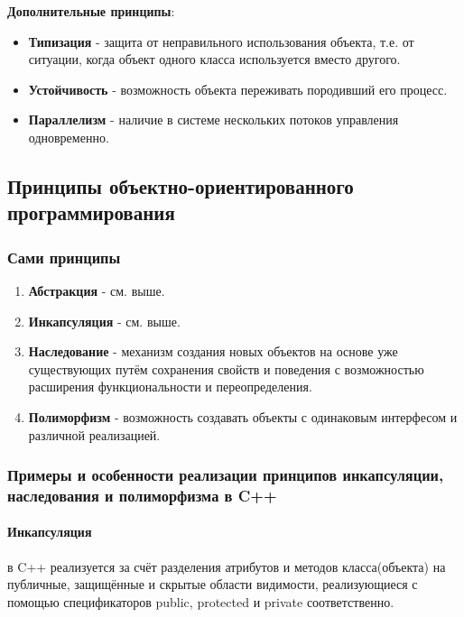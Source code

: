 \textbf{Дополнительные принципы}:
\begin{itemize}
    \item \begin{definition}\textbf{Типизация} - защита от неправильного использования объекта, т.е. от ситуации, когда объект одного класса используется вместо другого.\end{definition}
    \item \begin{definition}\textbf{Устойчивость} - возможность объекта переживать породивший его процесс.\end{definition}
    \item \begin{definition}\textbf{Параллелизм} - наличие в системе нескольких потоков управления одновременно.\end{definition}
\end{itemize}

\subsection{Принципы объектно-ориентированного программирования}
\subsubsection{Сами принципы}
\begin{enumerate}
    \item \textbf{Абстракция} - см. выше.
    \item \textbf{Инкапсуляция} - см. выше.
    \item \begin{definition}\textbf{Наследование} - механизм создания новых объектов на основе уже существующих путём сохранения свойств и поведения с возможностью расширения функциональности и переопределения.\end{definition}
    \item \begin{definition}\textbf{Полиморфизм} - возможность создавать объекты с одинаковым интерфесом и различной реализацией.\end{definition}
\end{enumerate}
\subsubsection{Примеры и особенности реализации принципов инкапсуляции, наследования и полиморфизма в C++}
\paragraph{Инкапсуляция} в C++ реализуется за счёт разделения атрибутов и методов класса(объекта) на публичные, защищённые и скрытые области видимости, реализующиеся с помощью спецификаторов public, protected и private соответственно.

